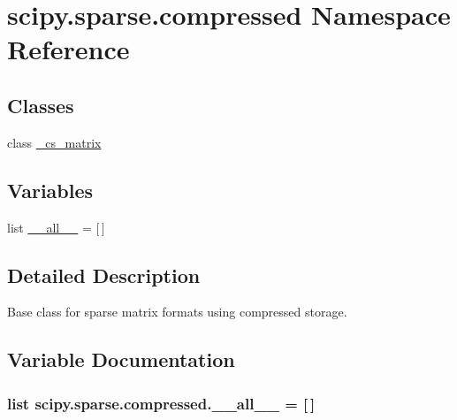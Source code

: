 \hypertarget{namespacescipy_1_1sparse_1_1compressed}{}\section{scipy.\+sparse.\+compressed Namespace Reference}
\label{namespacescipy_1_1sparse_1_1compressed}
\subsection*{Classes}
\begin{DoxyCompactItemize}
\item 
class \hyperlink{classscipy_1_1sparse_1_1compressed_1_1__cs__matrix}{\+\_\+cs\+\_\+matrix}
\end{DoxyCompactItemize}
\subsection*{Variables}
\begin{DoxyCompactItemize}
\item 
list \hyperlink{namespacescipy_1_1sparse_1_1compressed_acf116c6922f4c7e243274d72957745d6}{\+\_\+\+\_\+all\+\_\+\+\_\+} = \mbox{[}$\,$\mbox{]}
\end{DoxyCompactItemize}


\subsection{Detailed Description}
\begin{DoxyVerb}Base class for sparse matrix formats using compressed storage.\end{DoxyVerb}
 

\subsection{Variable Documentation}
\hypertarget{namespacescipy_1_1sparse_1_1compressed_acf116c6922f4c7e243274d72957745d6}{}
\subsubsection[{\+\_\+\+\_\+all\+\_\+\+\_\+}]{\setlength{\rightskip}{0pt plus 5cm}list scipy.\+sparse.\+compressed.\+\_\+\+\_\+all\+\_\+\+\_\+ = \mbox{[}$\,$\mbox{]}}\label{namespacescipy_1_1sparse_1_1compressed_acf116c6922f4c7e243274d72957745d6}
